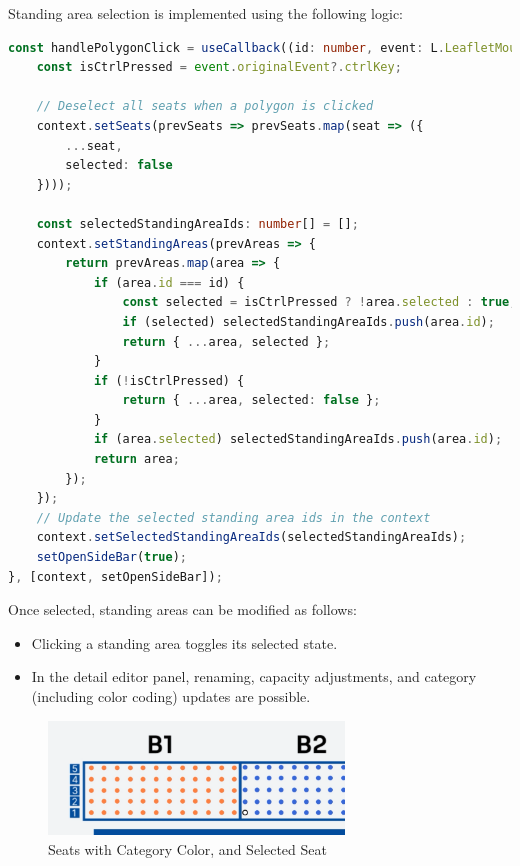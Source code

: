 Standing area selection is implemented using the following logic:
\begin{lstlisting}[language=TypeScript, caption=Handling Standing Area Selection, label=lst:select-standingareas]
const handlePolygonClick = useCallback((id: number, event: L.LeafletMouseEvent) => {
    const isCtrlPressed = event.originalEvent?.ctrlKey;

    // Deselect all seats when a polygon is clicked
    context.setSeats(prevSeats => prevSeats.map(seat => ({
        ...seat,
        selected: false
    })));

    const selectedStandingAreaIds: number[] = [];
    context.setStandingAreas(prevAreas => {
        return prevAreas.map(area => {
            if (area.id === id) {
                const selected = isCtrlPressed ? !area.selected : true;
                if (selected) selectedStandingAreaIds.push(area.id);
                return { ...area, selected };
            }
            if (!isCtrlPressed) {
                return { ...area, selected: false };
            }
            if (area.selected) selectedStandingAreaIds.push(area.id);
            return area;
        });
    });
    // Update the selected standing area ids in the context
    context.setSelectedStandingAreaIds(selectedStandingAreaIds);
    setOpenSideBar(true);
}, [context, setOpenSideBar]);
\end{lstlisting}

Once selected, standing areas can be modified as follows:
\begin{itemize}
    \item Clicking a standing area toggles its selected state.
    \item In the detail editor panel, renaming, capacity adjustments, and category (including color coding) updates are possible.
\end{itemize}

\begin{figure}[H]
    \centering
    \includegraphics[width=0.7\textwidth]{pics/MapComponentCategoryAndSelectedSeat.png}
    \caption{Seats with Category Color, and Selected Seat}
    \label{fig:map-component-category}
\end{figure}

